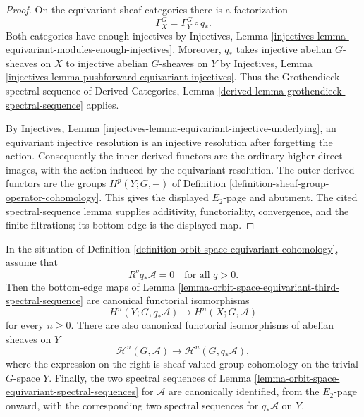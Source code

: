 \begin{proof}
On the equivariant sheaf categories there is a factorization
$$
\Gamma_X^G = \Gamma_Y^G \circ q_*.
$$
Both categories have enough injectives by Injectives, Lemma
\ref{injectives-lemma-equivariant-modules-enough-injectives}. Moreover,
$q_*$ takes injective abelian $G$-sheaves on $X$ to injective abelian
$G$-sheaves on $Y$ by Injectives, Lemma
\ref{injectives-lemma-pushforward-equivariant-injectives}. Thus the
Grothendieck spectral sequence of Derived Categories, Lemma
\ref{derived-lemma-grothendieck-spectral-sequence} applies.

By Injectives, Lemma
\ref{injectives-lemma-equivariant-injective-underlying}, an equivariant
injective resolution is an injective resolution after forgetting the action.
Consequently the inner derived functors are the ordinary higher direct images,
with the action induced by the equivariant resolution. The outer derived
functors are the groups $H^p(Y;G,-)$ of Definition
\ref{definition-sheaf-group-operator-cohomology}. This gives the displayed
$E_2$-page and abutment. The cited spectral-sequence lemma supplies
additivity, functoriality, convergence, and the finite filtrations; its bottom
edge is the displayed map.
\end{proof}

\begin{lemma}
\label{lemma-orbit-space-equivariant-pushforward-acyclic}
\begin{reference}
\cite[Chapter V, \S 5.2, Proposition 5.2.2, pp. 201--202]{Tohoku}
\end{reference}
In the situation of Definition
\ref{definition-orbit-space-equivariant-cohomology}, assume that
$$
R^qq_*\mathcal{A}=0
\quad\text{for all }q>0.
$$
Then the bottom-edge maps of Lemma
\ref{lemma-orbit-space-equivariant-third-spectral-sequence} are canonical
functorial isomorphisms
$$
H^n(Y;G,q_*\mathcal{A})
\longrightarrow
H^n(X;G,\mathcal{A})
$$
for every $n\geq 0$. There are also canonical functorial isomorphisms of
abelian sheaves on $Y$
$$
\mathcal{H}^n(G,\mathcal{A})
\longrightarrow
\mathcal{H}^n(G,q_*\mathcal{A}),
$$
where the expression on the right is sheaf-valued group cohomology on the
trivial $G$-space $Y$. Finally, the two spectral sequences of Lemma
\ref{lemma-orbit-space-equivariant-spectral-sequences} for $\mathcal{A}$ are
canonically identified, from the $E_2$-page onward, with the corresponding two
spectral sequences for $q_*\mathcal{A}$ on $Y$.
\end{lemma}

